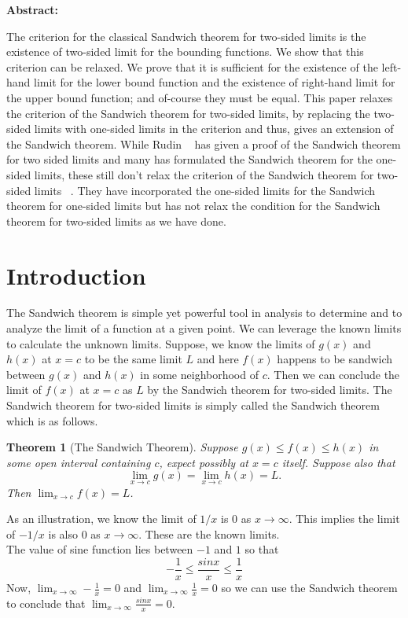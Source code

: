 \documentclass[a4paper,twoside,12pt]{article}
\theoremstyle{plain}
\newtheorem{theorem}{Theorem}[section]
\theoremstyle{definition}
\theoremstyle{theorem}
\begin{document}
\vspace{5mm}
\noindent
\textbf{Abstract:} {The criterion for the classical Sandwich theorem for two-sided limits is the existence of two-sided limit for the bounding functions. We show that this criterion can be relaxed. We prove that it is sufficient for the existence of the left-hand limit for the lower bound function and the existence of right-hand limit for the upper bound function; and of-course they must be equal. This paper relaxes the criterion of the Sandwich theorem for two-sided limits, by replacing the two-sided limits with one-sided limits in the criterion and thus, gives an extension of the Sandwich theorem. While Rudin ~\cite{rudin} has given a proof of the Sandwich theorem for two sided limits and many has formulated the Sandwich theorem for the one-sided limits, these still don't relax the criterion of the Sandwich theorem for two-sided limits ~\cite{thomas}. They have incorporated the one-sided limits for the Sandwich theorem for one-sided limits but has not relax the condition for the Sandwich theorem for two-sided limits as we have done.
\section{Introduction}
The Sandwich theorem is simple yet powerful tool in analysis to determine and to analyze the limit of a function at a given point. We can leverage the known limits to calculate the unknown limits. Suppose, we know the limits of \(g(x)\) and \(h(x)\) at \(x=c\) to be the same limit \(L\) and here \(f(x)\) happens to be sandwich between \(g(x)\) and \(h(x)\) in some neighborhood of \(c\). Then we can conclude the limit of \(f(x)\) at \(x=c\) as \(L\) by the Sandwich theorem for two-sided limits. The Sandwich theorem for two-sided limits is simply called the Sandwich theorem which is as follows.

\begin{theorem}[The Sandwich Theorem] \cite{thomas}
  \label{two-side}
Suppose $g(x) \leq f(x) \leq h(x)$ in some open interval containing $c$, expect possibly at $x=c$ itself. Suppose also that $$\lim_{x \to c} g(x) = \lim_{x \to c} h(x) =L  .$$ Then $\displaystyle \lim_{x \to c} f(x)=L$.
\end{theorem}


As an illustration, we know the limit of \(1/x\) is \(0\) as \(x
\to \infty\). This implies the limit of \(-1/x\) is also \(0\) as \(x \to \infty\). These are the known limits.\\
The value of sine function lies between \(-1\) and \(1\) so that \[\displaystyle -\frac{1}{x} \leq \frac{sinx}{x} \leq \frac{1}{x}\]
Now, \(\displaystyle \lim_{x \to \infty} -\frac{1}{x}=0\) and \(\displaystyle \lim_{x \to \infty} \frac{1}{x}=0\) so we can use the Sandwich theorem to conclude that \(\displaystyle \lim_{x \to \infty} \frac{sinx}{x}=0\).
\vspace{5mm}
}
\end{document}
